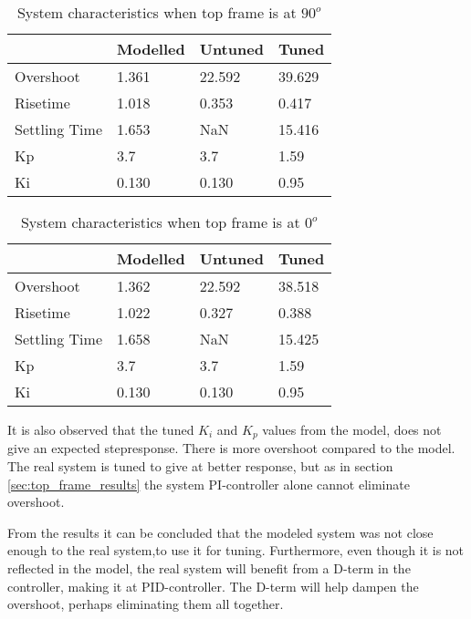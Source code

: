 \documentclass[../../Main]{subfiles}
\begin{document}
\begin{table}[H]
	\centering
	\begin{tabular}{l|*{3}{l}}
		&Modelled&Untuned&Tuned\\
		\hline
		Overshoot&1.361&22.592&39.629\\
		Risetime& 1.018&0.353&0.417\\
		Settling Time& 1.653&NaN& 15.416\\
		Kp&3.7&3.7&1.59\\
		Ki&0.130&0.130&0.95
	\end{tabular}
	\caption{System characteristics when top frame is at $90^o$}
	\label{tab:90_bot}
\end{table}

\begin{table}[H]
	\centering
	\begin{tabular}{l|*{3}{l}}
		&Modelled&Untuned&Tuned\\
		\hline
		Overshoot&1.362&22.592&38.518\\
		Risetime&1.022&0.327&0.388\\
		Settling Time&1.658&NaN&15.425\\
		Kp&3.7&3.7&1.59\\
		Ki&0.130&0.130&0.95
	\end{tabular}
	\caption{System characteristics when top frame is at $0^o$}
	\label{tab:0_bot}
\end{table}

It is also observed that the tuned $K_i$ and $K_p$ values from the model, does not give an expected stepresponse. There is more overshoot compared to the model. The real system is tuned to give at better response, but as in section \ref{sec:top_frame_results} the system PI-controller alone cannot eliminate overshoot.

From the results it can be concluded that the modeled system was not close enough to the real system,to use it for tuning. Furthermore, even though it is not reflected in the model, the real system will benefit from a D-term in the controller, making it at PID-controller. The D-term will help dampen the overshoot, perhaps eliminating them all together. 
\end{document}
